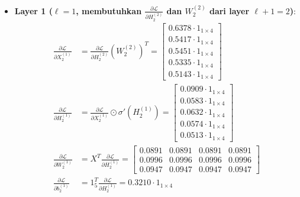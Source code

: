 \documentclass[11pt,a4paper]{article}
\def\mathbf#1{#1}%
\theoremstyle{plain}
\theoremstyle{definition}
\theoremstyle{remark}
\begin{document}
\begin{enumerate}
\begin{itemize}
\begin{align}
        \end{align}
        \item \textbf{Layer 1 ($\ell = 1$, membutuhkan $\frac{\partial \mathcal{L}}{\partial H^{(2)}_2}$ dan $W^{(2)}_2$ dari layer $\ell+1 = 2$)}:
        \begin{align}
            \frac{\partial \mathcal{L}}{\partial X^{(1)}_2} &= \frac{\partial \mathcal{L}}{\partial H^{(2)}_2} \left( W^{(2)}_2 \right)^T = \begin{bmatrix} 0.6378 \cdot \mathbf{1}_{1 \times 4} \\ 0.5417 \cdot \mathbf{1}_{1 \times 4} \\ 0.5451 \cdot \mathbf{1}_{1 \times 4} \\ 0.5335 \cdot \mathbf{1}_{1 \times 4} \\ 0.5143 \cdot \mathbf{1}_{1 \times 4} \end{bmatrix} \\[0.2em]
            \frac{\partial \mathcal{L}}{\partial H^{(1)}_2} &= \frac{\partial \mathcal{L}}{\partial X^{(1)}_2} \odot \sigma'\!\left(H^{(1)}_2\right) = \begin{bmatrix} 0.0909 \cdot \mathbf{1}_{1 \times 4} \\ 0.0583 \cdot \mathbf{1}_{1 \times 4} \\ 0.0632 \cdot \mathbf{1}_{1 \times 4} \\ 0.0574 \cdot \mathbf{1}_{1 \times 4} \\ 0.0513 \cdot \mathbf{1}_{1 \times 4} \end{bmatrix} \\[0.2em]
            \frac{\partial \mathcal{L}}{\partial W^{(1)}_2} &= X^T \frac{\partial \mathcal{L}}{\partial H^{(1)}_2} = \begin{bmatrix} 0.0891 & 0.0891 & 0.0891 & 0.0891 \\ 0.0996 & 0.0996 & 0.0996 & 0.0996 \\ 0.0947 & 0.0947 & 0.0947 & 0.0947 \end{bmatrix} \\[0.2em]
            \frac{\partial \mathcal{L}}{\partial \mathbf{b}^{(1)}_2} &= \mathbf{1}_5^T \frac{\partial \mathcal{L}}{\partial H^{(1)}_2} = 0.3210 \cdot \mathbf{1}_{1 \times 4}
        \end{align}
    \end{itemize}


\end{enumerate}
\end{document}
